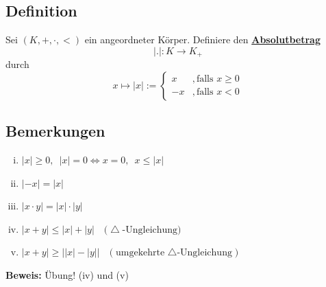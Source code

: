 \subsection{Definition}
Sei \((K,+, \cdot, <)\) ein angeordneter Körper. Definiere den \underline{\textbf{Absolutbetrag}}
\[
|.| : K \to K_+
\]
durch
\[
x \mapsto |x|  := 
\begin{cases}
x &, \text{falls } x\geq 0 \\
-{x} &, \text{falls } x<0
\end{cases}
\]

\subsection{Bemerkungen}
\begin{enumerate}[(i)]
\item\(|x| \geq 0 , \enspace |x|=0 \Longleftrightarrow x=0 , \enspace x \leq |x|\)
\item \(|-x| =|x|\)
\item \(|x\cdot y| = |x| \cdot |y|\)
\item \(|x+y| \leq |x| + |y| \quad \Big(\bigtriangleup\text{-Ungleichung}\Big)\) 
\item \(|x+y| \geq \Big| |x| -|y| \Big|\quad \Big(\text{umgekehrte $\bigtriangleup$-Ungleichung}\Big)\)
\end{enumerate}
\textbf{Beweis:} Übung! (iv) und (v)

